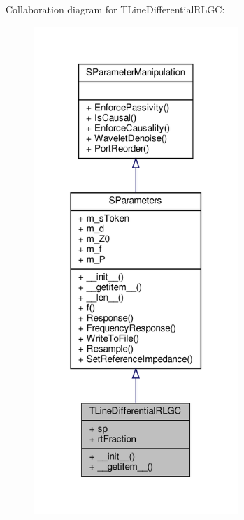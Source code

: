 Collaboration diagram for T\+Line\+Differential\+R\+L\+GC\+:\nopagebreak
\begin{figure}[H]
\begin{center}
\leavevmode
\includegraphics[width=220pt]{classSignalIntegrity_1_1SParameters_1_1Devices_1_1TLineDifferentialRLGC_1_1TLineDifferentialRLGC__coll__graph}
\end{center}
\end{figure}
